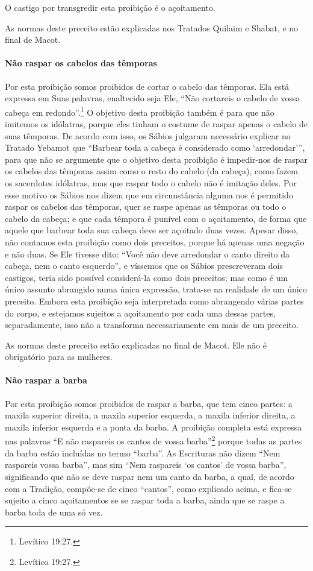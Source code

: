 O castigo por transgredir esta proibição é o açoitamento.

As normas deste preceito estão explicadas nos Tratados Quilaim e Shabat,
e no final de Macot.

\paragraph{Não raspar os cabelos das têmporas}

Por esta proibição somos proibidos de cortar o cabelo das têmporas. Ela
está expressa em Suas palavras, enaltecido seja Ele, ``Não cortareis o
cabelo de vossa cabeça em redondo''.\footnote{Levítico 19:27.} O objetivo desta
proibição também é para que não imitemos os idólatras, porque eles
tinham o costume de raspar apenas o cabelo de suas têmporas. De acordo
com isso, os Sábios julgaram necessário explicar no Tratado Yebamot que
``Barbear toda a cabeça é considerado como `arredondar''', para que não
se argumente que o objetivo desta proibição é impedir-nos de raspar os
cabelos das têmporas assim como o resto do cabelo (da cabeça), como
fazem os sacerdotes idólatras, mas que raspar todo o cabelo não é
imitação deles. Por esse motivo os Sábios nos dizem que em circunstância
alguma nos é permitido raspar os cabelos das têmporas, quer se raspe
apenas as têmporas ou todo o cabelo da cabeça; e que cada têmpora é
punível com o açoitamento, de forma que aquele que barbear toda sua
cabeça deve ser açoitado duas vezes. Apesar disso, não contamos esta
proibição como dois preceitos, porque há apenas uma negação e não duas.
Se Ele tivesse dito: ``Você não deve arredondar o canto direito da
cabeça, nem o canto esquerdo'', e víssemos que os Sábios prescreveram
dois castigos, teria sido possível considerá-la como dois preceitos; mas
como é um único assunto abrangido numa única expressão, trata-se na
realidade de um único preceito. Embora esta proibição seja interpretada
como abrangendo várias partes do corpo, e estejamos sujeitos a
açoitamento por cada uma dessas partes, separadamente, isso não a
transforma necessariamente em mais de um preceito.

As normas deste preceito estão explicadas no final de Macot. Ele não é
obrigatório para as mulheres.

\paragraph{Não raspar a barba}

Por esta proibição somos proibidos de raspar a barba, que tem cinco
partes: a maxila superior direita, a maxila superior esquerda, a maxila
inferior direita, a maxila inferior esquerda e a ponta da barba. A
proibição completa está expressa nas palavras ``E não raspareis os
cantos de vossa barba''\footnote{Levítico 19:27.} porque todas as partes da
barba estão incluídas no termo ``barba''. As Escrituras não dizem ``Nem
raspareis vossa barba'', mas sim ``Nem raspareis `os cantos' de vossa
barba'', significando que não se deve raspar nem um canto da barba, a
qual, de acordo com a Tradição, compõe-se de cinco ``cantos'', como
explicado acima, e fica-se sujeito a cinco açoitamentos se se raspar
toda a barba, ainda que se raspe a barba toda de uma só vez.

